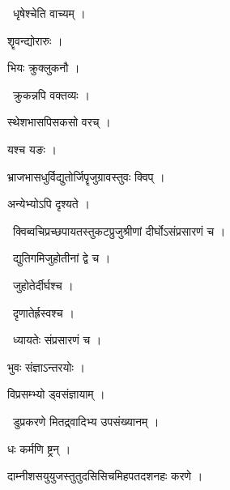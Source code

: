 \documentclass[10pt, openany, oneside]{book}
\begin{document}
\par\noindent\hspace{1.5em}{\vps वा॰}~{\qt धृषेश्चेति वाच्यम् ।}

\noindent शॄवन्द्योरारुः ।

\noindent भियः क्रुक्लुकनौ ।

\par\noindent\hspace{1.5em}{\vps वा॰}~{\qt क्रुकन्नपि वक्तव्यः ।}

\noindent स्थेशभासपिसकसो वरच् ।

\noindent यश्च यङः ।

\noindent भ्राजभासधुर्विद्युतोर्जिपॄजुग्रावस्तुवः क्विप् ।

\noindent अन्येभ्योऽपि दृश्यते ।

\par\noindent\hspace{1.5em}{\vps वा॰}~{\qt क्विब्वचिप्रच्छपायतस्तुकटप्रुजुश्रीणां दीर्घोऽसंप्रसारणं च ।}

\par\noindent\hspace{1.5em}{\vps वा॰}~{\qt द्युतिगमिजुहोतीनां द्वे च ।}

\par\noindent\hspace{1.5em}{\vps वा॰}~{\qt जुहोतेर्दीर्घश्च ।}

\par\noindent\hspace{1.5em}{\vps वा॰}~{\qt दृणातेर्ह्रस्वश्च ।}

\par\noindent\hspace{1.5em}{\vps वा॰}~{\qt ध्यायतेः संप्रसारणं च ।}

\noindent भुवः संज्ञाऽन्तरयोः ।

\noindent विप्रसम्भ्यो ड्वसंज्ञायाम् ।

\par\noindent\hspace{1.5em}{\vps वा॰}~{\qt डुप्रकरणे मितद्र्वादिभ्य उपसंख्यानम् ।}

\noindent धः कर्मणि ष्ट्रन् ।

\noindent दाम्नीशसयुयुजस्तुतुदसिसिचमिहपतदशनहः करणे ।
\end{document}
